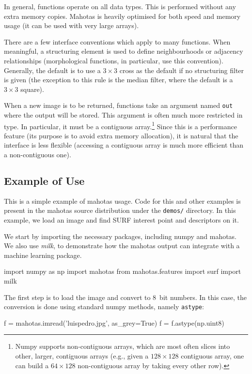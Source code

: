 \documentclass{article}
\let\code\texttt
\begin{document}
In general, functions operate on all data types. This is performed without any
extra memory copies. Mahotas is heavily optimised for both speed and memory
usage (it can be used with very large arrays).

There are a few interface conventions which apply to many functions. When
meaningful, a structuring element is used to define neighbourhoods or adjacency
relationships (morphological functions, in particular, use this convention).
Generally, the default is to use a $3 \times 3$ cross as the default if no
structuring filter is given (the exception to this rule is the median filter,
where the default is a $3 \times 3$ square).

When a new image is to be returned, functions take an argument named \code{out}
where the output will be stored. This argument is often much more restricted in
type. In particular, it must be a contiguous array.\footnote{Numpy supports
non-contiguous arrays, which are most often slices into other, larger,
contiguous arrays (e.g., given a $128 \times 128$ contiguous array, one can
build a $64 \times 128$ non-contiguous array by taking every other row).} Since
this is a performance feature (its purpose is to avoid extra memory
allocation), it is natural that the interface is less flexible (accessing a
contiguous array is much more efficient than a non-contiguous one).

\subsection{Example of Use}

This is a simple example of mahotas usage. Code for this and other examples is
present in the mahotas source distribution under the \texttt{demos/} directory.
In this example, we load an image and find SURF interest point and descriptors
on it.

We start by importing the necessary packages, including numpy and mahotas. We
also use \textit{milk}, to demonstrate how the mahotas output can integrate
with a machine learning package.

\begin{python}
import numpy as np
import mahotas
from mahotas.features import surf
import milk
\end{python}

The first step is to load the image and convert to 8~bit numbers. In this
case, the conversion is done using standard numpy methods, namely
\code{astype}:

\begin{python}
f = mahotas.imread('luispedro.jpg', as_grey=True)
f = f.astype(np.uint8)
\end{python}
\end{document}
